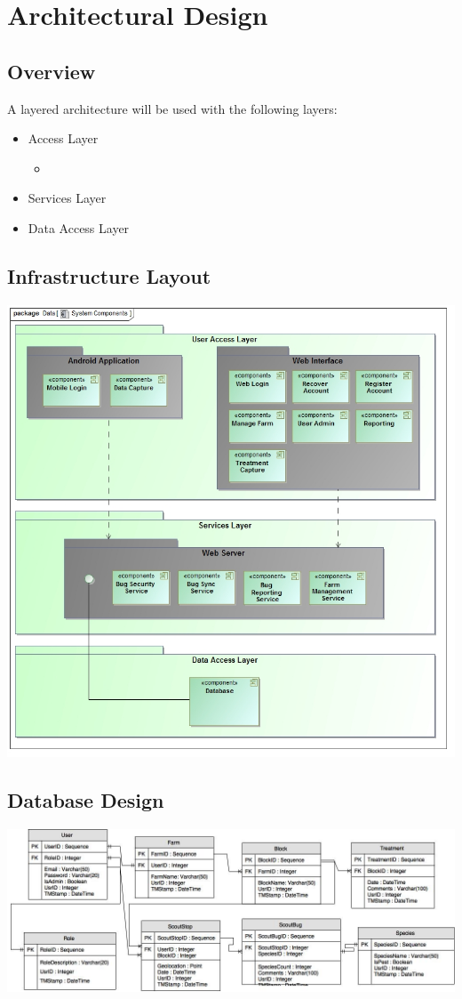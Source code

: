 \documentclass[11pt,a4paper,titlepage]{article}
\begin{document}
\section{Architectural Design}
	\subsection{Overview}
		A layered architecture will be used with the following layers:
			\begin{itemize}
				\item Access Layer
					\begin{itemize}
						\item 
					\end{itemize}
				\item Services Layer
				\item Data Access Layer
			\end{itemize}
	\subsection{Infrastructure Layout}
		\includegraphics[width=\linewidth]{SystemComponents}	
	\subsection{Database Design}
	\includegraphics[width=\linewidth]{ERD}	
\end{document}
